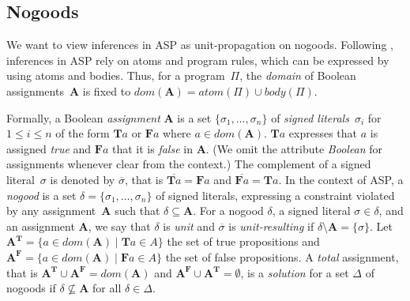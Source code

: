 \documentclass{tlp}
\newcommand{\assignment}{\mathbf{A}}
\newcommand{\tass}[1]{\mathbf{T}#1}
\newcommand{\fass}[1]{\mathbf{F}#1}
\newcommand{\Tass}{\assignment^\mathbf{T}}
\newcommand{\Fass}{\assignment^\mathbf{F}}
\newcommand{\atom}[1]{atom(#1)}
\newcommand{\body}[1]{body(#1)}
\newcommand{\domain}[1]{dom(#1)}
\begin{document}
\subsection{Nogoods}

We want to view inferences in ASP as unit-propagation on nogoods. 
Following , inferences in ASP rely on atoms and program rules, which can be expressed by using atoms and bodies. Thus, for a program~$\Pi$, the \emph{domain} of Boolean assignments~$\assignment$ is fixed to $\domain{\assignment} = \atom{\Pi} \cup \body{\Pi}$.

Formally, a Boolean \emph{assignment} $\assignment$ is a set $\{ \sigma_1, \dots, \sigma_n \}$ of \emph{signed literals}~$\sigma_i$ for $1 \leq i \leq n$ of the form $\tass{a}$ or $\fass{a}$ where $a \in \domain{\assignment}$. $\tass{a}$ expresses that $a$ is assigned \emph{true} and $\fass{a}$ that it is \emph{false} in $\assignment$. (We omit the attribute \emph{Boolean} for assignments whenever clear from the context.) The complement of a signed literal~$\sigma$ is denoted by $\overline{\sigma}$, that is $\overline{\tass{a}} = \fass{a}$ and $\overline{\fass{a}} = \tass{a}$.
In the context of ASP, a \emph{nogood} \cite{dechter03} is a set $\delta = \{ \sigma_1, \dots, \sigma_n \}$ of signed literals, expressing a constraint violated by any assignment~$\assignment$ such that $\delta \subseteq \assignment$.
For a nogood $\delta$, a signed literal $\sigma \in \delta$, and an assignment $\assignment$, we say that $\delta$ is \emph{unit} and $\overline{\sigma}$ is \emph{unit-resulting} if $\delta \setminus \assignment = \{\sigma\}$.
Let $\Tass = \{ a \in \domain{\assignment} \mid \tass{a} \in A \}$ the set of true propositions and $\Fass = \{ a \in \domain{\assignment} \mid \fass{a} \in A \}$ the set of false propositions. A \emph{total} assignment, that is $\Tass \cup \Fass = \domain{\assignment}$ and $\Fass \cup \Tass = \emptyset$, is a \emph{solution} for a set $\Delta$ of nogoods if $\delta \not\subseteq \assignment$ for all $\delta \in \Delta$.
\end{document}

